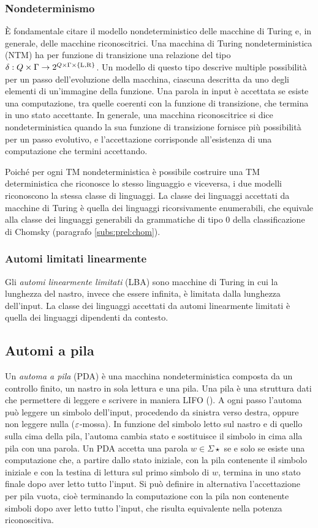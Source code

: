 \subsubsection{Nondeterminismo}
È fondamentale citare il modello nondeterministico delle macchine di Turing e, in generale, delle macchine riconoscitrici. Una macchina di Turing nondeterministica (NTM) ha per funzione di transizione una relazione del tipo $\delta:Q\times\Gamma\to 2^{Q\times\Gamma\times\left\{ \mathrm L,\mathrm R \right\}}$. Un modello di questo tipo descrive multiple possibilità per un passo dell'evoluzione della macchina, ciascuna descritta da uno degli elementi di un'immagine della funzione. Una parola in input è accettata se esiste una computazione, tra quelle coerenti con la funzione di transizione, che termina in uno stato accettante.
In generale, una macchina riconoscitrice si dice nondeterministica quando la sua funzione di transizione fornisce più possibilità per un passo evolutivo, e l'accettazione corrisponde all'esistenza di una computazione che termini accettando.

Poiché per ogni TM nondeterministica è possibile costruire una TM deterministica che riconosce lo stesso linguaggio e viceversa, i due modelli riconoscono la stessa classe di linguaggi. La classe dei linguaggi accettati da macchine di Turing è quella dei linguaggi ricorsivamente enumerabili, che equivale alla classe dei linguaggi generabili da grammatiche di tipo 0 della classificazione di Chomsky (paragrafo \ref{subs:prel:chom}).

\subsubsection{Automi limitati linearmente}
Gli \emph{automi linearmente limitati} (LBA) sono macchine di Turing in cui la lunghezza del nastro, invece che essere infinita, è limitata dalla lunghezza dell'input. La classe dei linguaggi accettati da automi linearmente limitati è quella dei linguaggi dipendenti da contesto.


\subsection{Automi a pila}\label{subs:prel:PDA}
Un \emph{automa a pila} (PDA) è una macchina nondeterministica composta da un controllo finito, un nastro in sola lettura e una pila. Una pila è una struttura dati che permettere di leggere e scrivere in maniera LIFO (). A ogni passo l'automa può leggere un simbolo dell'input, procedendo da sinistra verso destra, oppure non leggere nulla ($\varepsilon$-mossa). In funzione del simbolo letto sul nastro e di quello sulla cima della pila, l'automa cambia stato e sostituisce il simbolo in cima alla pila con una parola. Un PDA accetta una parola $w\in\Sigma\star$ se e solo se esiste una computazione che, a partire dallo stato iniziale, con la pila contenente il simbolo iniziale e con la testina di lettura sul primo simbolo di $w$, termina in uno stato finale dopo aver letto tutto l'input. Si può definire in alternativa l'accettazione per pila vuota, cioè terminando la computazione con la pila non contenente simboli dopo aver letto tutto l'input, che risulta equivalente nella potenza riconoscitiva.

